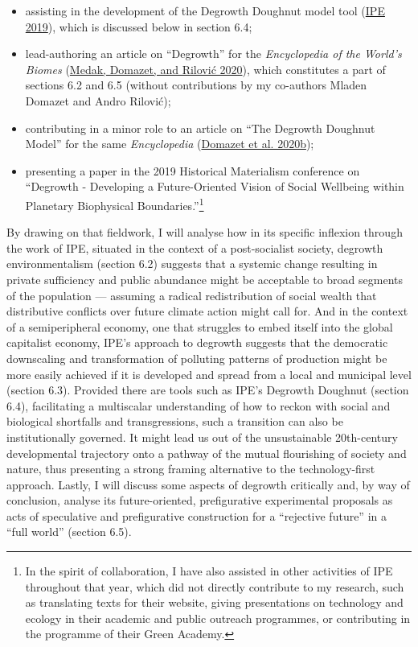 \documentclass[a4paper, nobind]{templates/ociamthesis}
\providecommand{\tightlist}{%
  \setlength{\itemsep}{0pt}\setlength{\parskip}{0pt}}
\begin{document}
\begin{itemize}
\tightlist
\item
  assisting in the development of the Degrowth Doughnut model tool (\protect\hyperlink{ref-ipe_degrowth_2019}{IPE 2019}), which is discussed below in section 6.4;
\item
  lead-authoring an article on ``Degrowth'' for the \emph{Encyclopedia of the World's Biomes} (\protect\hyperlink{ref-medak_degrowth_2020}{Medak, Domazet, and Rilović 2020}), which constitutes a part of sections 6.2 and 6.5 (without contributions by my co-authors Mladen Domazet and Andro Rilović);
\item
  contributing in a minor role to an article on ``The Degrowth Doughnut Model'' for the same \emph{Encyclopedia} (\protect\hyperlink{ref-domazet_mental_2020}{Domazet et al. 2020b});
\item
  presenting a paper in the 2019 Historical Materialism conference on ``Degrowth - Developing a Future-Oriented Vision of Social Wellbeing within Planetary Biophysical Boundaries.''\footnote{In the spirit of collaboration, I have also assisted in other activities of IPE throughout that year, which did not directly contribute to my research, such as translating texts for their website, giving presentations on technology and ecology in their academic and public outreach programmes, or contributing in the programme of their Green Academy.}
\end{itemize}

By drawing on that fieldwork, I will analyse how in its specific inflexion through the work of IPE, situated in the context of a post-socialist society, degrowth environmentalism (section 6.2) suggests that a systemic change resulting in private sufficiency and public abundance might be acceptable to broad segments of the population --- assuming a radical redistribution of social wealth that distributive conflicts over future climate action might call for. And in the context of a semiperipheral economy, one that struggles to embed itself into the global capitalist economy, IPE's approach to degrowth suggests that the democratic downscaling and transformation of polluting patterns of production might be more easily achieved if it is developed and spread from a local and municipal level (section 6.3). Provided there are tools such as IPE's Degrowth Doughnut (section 6.4), facilitating a multiscalar understanding of how to reckon with social and biological shortfalls and transgressions, such a transition can also be institutionally governed. It might lead us out of the unsustainable 20th-century developmental trajectory onto a pathway of the mutual flourishing of society and nature, thus presenting a strong framing alternative to the technology-first approach. Lastly, I will discuss some aspects of degrowth critically and, by way of conclusion, analyse its future-oriented, prefigurative experimental proposals as acts of speculative and prefigurative construction for a ``rejective future'' in a ``full world'' (section 6.5).
\end{document}
